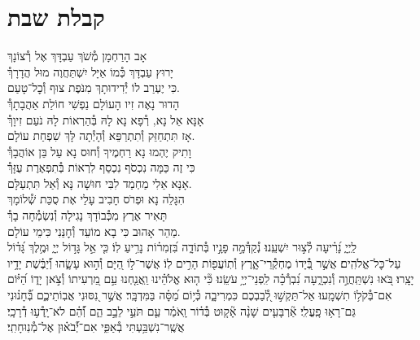 \documentclass[twoside, openany, parskip=half, 11pt]{book}
\begin{document}
\chapter[קבלת שבת]{ קבלת שבת }
\label{kabalas_shabbos}

אָב הָרַחְמָן מְ֯שֹׁךְ עַבְדָּךְ אֶל רְ֯צוֹנָךְ\\
יָרוּץ עַבְדָּךְ כְּ֯מוֹ אַיָּל יִשְׁתַּחֲוֶה מוּל הֲדָרָךְ֯\\
כִּי יֶעְרַב לוֹ יְ֯דִידוּתָךְ מִנֹּפֶת צוּף וְ֯כׇל־טָעַם.\\


הָדוּר נָאֶה זִיו הָעוֹלָם נַפְשִׁי חוֹלַת אַהֲבָתָךְ֯\\
אָנָּא אֵל נָא, רְ֯פָא נָא לָהּ בְּ֯הַרְאוֹת לָהּ נֹעַם זִיוָךְ֯\\
אָז תִּתְחַזֵּק וְ֯תִתְרַפֵּא וְ֯הָיְ֯תָה לָּךְ שִׁפְחַת עוֹלָם.\\


וָתִיק יֶהְמוּ נָא רַחְמֶיךָ וְ֯חוּס נָא עַל בֵּן אוֹהֲבָךְ֯\\
כִּי זֶה כַּמָּה נִכְסֹף נִכְסַף לִרְאוֹת בְּ֯תִפְאֶרֶת עֻזָּךְ֯\\
אָנָּא אֵלִי מַחְמַד לִבִּי חוּשָׁה נָּא וְ֯אַל תִּתְעַלָּם.\\

הִגָּלֵה נָא וּפְרֹס חָבִיב עָלַי אֶת סֻכַּת שְׁ֯לוֹמָךְ\\
תָּאִיר אֶרֶץ מִכְּ֯בוֹדָךְ נָגִילָה וְ֯נִשְׂמְ֯חָה בָךְ֯\\
מַהֵר אָהוּב כִּי בָא מוֹעֵד וְ֯חׇנֵּנִי כִּימֵי עוֹלָם.\\

לַֽיְיָ֑ נָ֝רִ֗יעָה לְ֯צ֣וּר יִשְׁעֵֽנוּ׃
נְ֯קַדְּ֯מָ֣ה פָנָ֣יו בְּ֯תוֹדָ֑ה בִּ֝זְמִר֗וֹת נָרִ֥יעַ לֽוֹ׃
כִּ֤י אֵ֣ל גָּד֣וֹל יְיָ֑ וּמֶ֥לֶךְ גָּ֝ד֗וֹל עַל־כׇּל־אֱלֹהִֽים׃
אֲשֶׁ֣ר בְּ֭֯יָדוֹ מֶחְקְ֯רֵי־אָ֑רֶץ וְ֯תֽוֹעֲפ֖וֹת הָרִ֣ים לֽוֹ׃
אֲשֶׁר־ל֣וֹ הַ֭יָּם וְ֯ה֣וּא עָשָׂ֑הוּ וְ֝֯יַבֶּ֗שֶׁת יָדָ֥יו יָצָֽרוּ׃
בֹּ֭אוּ נִשְׁתַּֽחֲוֶ֣ה וְ֯נִכְרָ֑עָה נִ֝בְרְ֯כָ֗ה לִֽפְנֵי־יְיָ֥ עֹשֵֽׂנוּ׃
כִּ֘י ה֤וּא אֱלֹהֵ֗ינוּ וַֽאֲנַ֤חְנוּ עַ֣ם מַ֭רְעִיתוֹ וְ֯צֹ֣אן יָד֑וֹ הַ֝יּ֗וֹם אִם־בְּ֯קֹל֥וֹ תִשְׁמָֽעוּ׃
אַל־תַּקְשׁ֣וּ לְ֭֯בַבְכֶם כִּמְרִיבָ֑ה כְּ֯י֥וֹם מַ֝סָּ֗ה בַּמִּדְבָּֽר׃
אֲשֶׁ֣ר נִ֭סּוּנִי אֲבֽוֹתֵיכֶ֑ם בְּ֝֯חָנ֗וּנִי גַּם־רָא֥וּ פָֽעֳלִֽי׃
אַ֘רְבָּעִ֤ים שָׁנָ֨ה אָ֘ק֤וּט בְּ֯ד֗וֹר וָֽאֹמַ֗ר עַ֤ם תֹּעֵ֣י לֵבָ֣ב הֵ֑ם וְ֝֯הֵ֗ם לֹא־יָֽדְ֯ע֥וּ דְ֯רָכָֽי׃
אֲשֶֽׁר־נִשְׁבַּ֥עְתִּי בְ֯אַפִּ֑י אִם־יְ֝֯בֹא֗וּן אֶל־מְ֯נֽוּחָתִֽי׃
\end{document}
